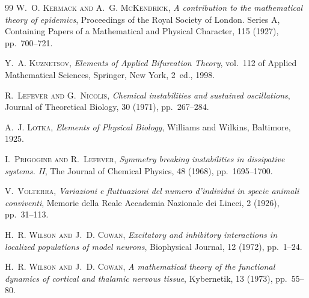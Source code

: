 \begin{thebibliography}{99}
\textsc{W.~O. Kermack and A.~G. McKendrick}, \emph{A contribution to the
  mathematical theory of epidemics}, Proceedings of the Royal Society of
  London. Series A, Containing Papers of a Mathematical and Physical
  Character, 115 (1927), pp.~700--721.

\textsc{Y.~A. Kuznetsov}, \emph{Elements of Applied Bifurcation Theory},
  vol.~112 of Applied Mathematical Sciences, Springer, New York, 2~ed.,
  1998.

\textsc{R.~Lefever and G.~Nicolis}, \emph{Chemical instabilities and
  sustained oscillations}, Journal of Theoretical Biology, 30 (1971),
  pp.~267--284.

\textsc{A.~J. Lotka}, \emph{Elements of Physical Biology}, Williams and
  Wilkins, Baltimore, 1925.

\textsc{I.~Prigogine and R.~Lefever}, \emph{Symmetry breaking
  instabilities in dissipative systems. {II}}, The Journal of Chemical
  Physics, 48 (1968), pp.~1695--1700.

\textsc{V.~Volterra}, \emph{Variazioni e fluttuazioni del numero
  d'individui in specie animali conviventi}, Memorie della Reale
  Accademia Nazionale dei Lincei, 2 (1926), pp.~31--113.

\textsc{H.~R. Wilson and J.~D. Cowan}, \emph{Excitatory and inhibitory
  interactions in localized populations of model neurons}, Biophysical
  Journal, 12 (1972), pp.~1--24.

\textsc{H.~R. Wilson and J.~D. Cowan}, \emph{A mathematical theory of the
  functional dynamics of cortical and thalamic nervous tissue},
  Kybernetik, 13 (1973), pp.~55--80.

\end{thebibliography}



